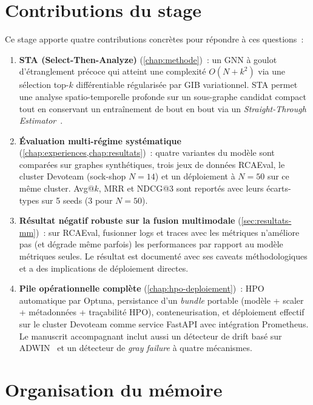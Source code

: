 \documentclass[a4paper,11pt,oneside]{report}
\begin{document}
\section{Contributions du stage}
\label{sec:contributions}

Ce stage apporte quatre contributions concr\`etes pour r\'epondre \`a ces questions~:

\begin{enumerate}
  \item \textbf{STA (Select-Then-Analyze)} (\cref{chap:methode})~: un GNN \`a goulot d'\'etranglement pr\'ecoce qui atteint une complexit\'e $O(N + k^2)$ via une s\'election top-$k$ diff\'erentiable r\'egularis\'ee par GIB variationnel. STA permet une analyse spatio-temporelle profonde sur un sous-graphe candidat compact tout en conservant un entra\^inement de bout en bout via un \emph{Straight-Through Estimator}~\cite{bengio2013ste,jang2017gumbel}.
  \item \textbf{\'Evaluation multi-r\'egime syst\'ematique} (\cref{chap:experiences,chap:resultats})~: quatre variantes du mod\`ele sont compar\'ees sur graphes synth\'etiques, trois jeux de donn\'ees RCAEval, le cluster Devoteam (sock-shop $N{=}14$) et un d\'eploiement \`a $N{=}50$ sur ce m\^eme cluster. Avg@$k$, MRR et NDCG@3 sont report\'es avec leurs \'ecarts-types sur 5 seeds (3 pour $N{=}50$).
  \item \textbf{R\'esultat n\'egatif robuste sur la fusion multimodale} (\cref{sec:resultats-mm})~: sur RCAEval, fusionner logs et traces avec les m\'etriques n'am\'eliore pas (et d\'egrade m\^eme parfois) les performances par rapport au mod\`ele m\'etriques seules. Le r\'esultat est document\'e avec ses caveats m\'ethodologiques et a des implications de d\'eploiement directes.
  \item \textbf{Pile op\'erationnelle compl\`ete} (\cref{chap:hpo-deploiement})~: HPO automatique par Optuna, persistance d'un \emph{bundle} portable (mod\`ele + scaler + m\'etadonn\'ees + tra\c{c}abilit\'e HPO), conteneurisation, et d\'eploiement effectif sur le cluster Devoteam comme service FastAPI avec int\'egration Prometheus. Le manuscrit accompagnant inclut aussi un d\'etecteur de drift bas\'e sur ADWIN~\cite{bifet2007adwin} et un d\'etecteur de \emph{gray failure} \`a quatre m\'ecanismes.
\end{enumerate}

\section{Organisation du m\'emoire}
\label{sec:plan}
\end{document}
